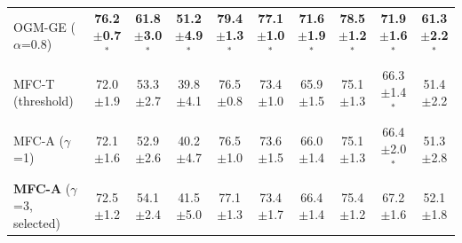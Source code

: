 \documentclass[fleqn,10pt]{wlscirep}
\begin{document}
\begin{table}[t]
\begin{tabular}{@{}lccccccccc@{}}
OGM-GE ($\alpha$=0.8) & \textbf{76.2$\pm$0.7$^{*}$} & \textbf{61.8$\pm$3.0$^{*}$} & \textbf{51.2$\pm$4.9$^{*}$} & \textbf{79.4$\pm$1.3$^{*}$} & \textbf{77.1$\pm$1.0$^{*}$} & \textbf{71.6$\pm$1.9$^{*}$} & \textbf{78.5$\pm$1.2$^{*}$} & \textbf{71.9$\pm$1.6$^{*}$} & \textbf{61.3$\pm$2.2$^{*}$} \\
MFC-T (threshold) & 72.0$\pm$1.9 & 53.3$\pm$2.7 & 39.8$\pm$4.1 & 76.5$\pm$0.8 & 73.4$\pm$1.0 & 65.9$\pm$1.5 & 75.1$\pm$1.3 & 66.3$\pm$1.4$^{*}$ & 51.4$\pm$2.2 \\
MFC-A ($\gamma$=1) & 72.1$\pm$1.6 & 52.9$\pm$2.6 & 40.2$\pm$4.7 & 76.5$\pm$1.0 & 73.6$\pm$1.5 & 66.0$\pm$1.4 & 75.1$\pm$1.3 & 66.4$\pm$2.0$^{*}$ & 51.3$\pm$2.8 \\
\textbf{MFC-A} ($\gamma$=3, selected) & 72.5$\pm$1.2 & 54.1$\pm$2.4 & 41.5$\pm$5.0 & 77.1$\pm$1.3 & 73.4$\pm$1.7 & 66.4$\pm$1.4 & 75.4$\pm$1.2 & 67.2$\pm$1.6 & 52.1$\pm$1.8 \\
\bottomrule
\end{tabular}
\end{table}
\end{document}
